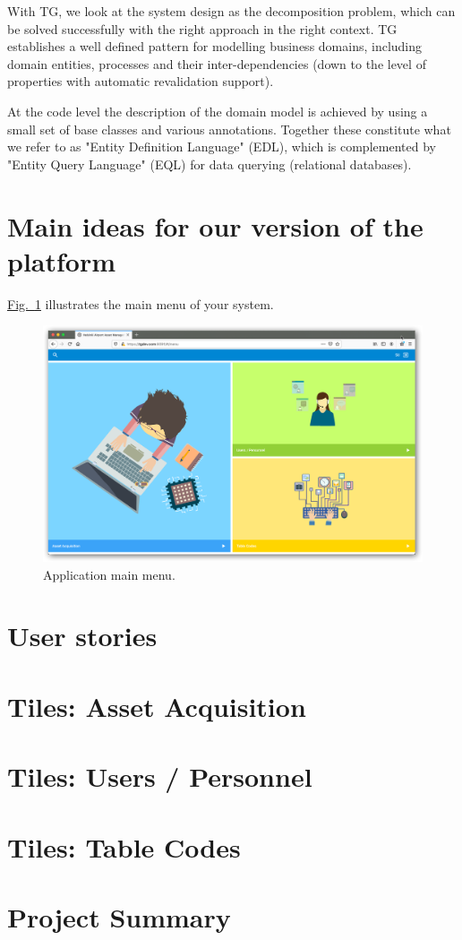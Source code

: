 \documentclass[a4paper, 12pt, final]{hitec}
\begin{document}
  With TG, we look at the system design as the decomposition problem,
  which can be solved successfully with the right approach in the right context.
  TG establishes a well defined pattern for modelling business domains,
  including domain entities, processes and their inter-dependencies (down to the
  level of properties with automatic revalidation support).
  
  At the code level the
  description of the domain model is achieved by using a small set of base classes
  and various annotations. Together these constitute what we refer to as "Entity
  Definition Language" (EDL), which is complemented by "Entity Query Language"
  (EQL) for data querying (relational databases).
  \clearpage

  \section{Main ideas for our version of the platform}\label{sec:02}
  \hyperref[sec:01_01:fig:01]{Fig.~\ref*{sec:01_01:fig:01}} illustrates the main menu of your system.
	\begin{figure}[!htbp]
	\centering
	\includegraphics[width=0.95\linewidth]{images/01-main-menu.png}
	\caption{Application main menu.}\label{sec:01_01:fig:01}
  \end{figure}
  \clearpage

  \section{User stories}\label{sec:03}
  \clearpage

  \section{Tiles: Asset Acquisition}\label{sec:04}
  \clearpage

  \section{Tiles: Users / Personnel}\label{sec:05}
  \clearpage

  \section{Tiles: Table Codes}\label{sec:06}
  \clearpage

  \section{Project Summary}\label{sec:07}
  \clearpage
\end{document}

